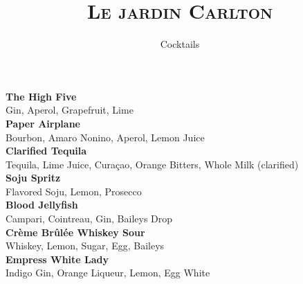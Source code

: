 \documentclass[12pt]{article}
\author{Cocktails}
\begin{document}
\title{\textsc{Le jardin Carlton}}
\date{}
\maketitle

\vspace{0.8cm}

\textsf{\textbf{The High Five}} \\
{\monofont Gin, Aperol, Grapefruit, Lime} \\[1em]

\textsf{\textbf{Paper Airplane}} \\
{\monofont Bourbon, Amaro Nonino, Aperol, Lemon Juice} \\[1em]

\textsf{\textbf{Clarified Tequila}} \\
{\monofont Tequila, Lime Juice, Curaçao, Orange Bitters, Whole Milk (clarified)} \\[1em]

\textsf{\textbf{Soju Spritz}} \\
{\monofont Flavored Soju, Lemon, Prosecco} \\[1em]

\textsf{\textbf{Blood Jellyfish}} \\
{\monofont Campari, Cointreau, Gin, Baileys Drop} \\[1em]

\textsf{\textbf{Crème Brûlée Whiskey Sour}} \\
{\monofont Whiskey, Lemon, Sugar, Egg, Baileys} \\[1em]

\textsf{\textbf{Empress White Lady}} \\
{\monofont Indigo Gin, Orange Liqueur, Lemon, Egg White}
\end{document}
